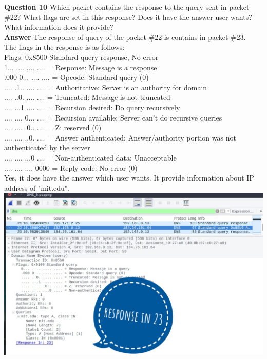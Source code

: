 \documentclass[14pt]{extarticle}
\begin{document}
    \noindent
    \textbf{\large Question 10}
    Which packet contains the response to the query sent in packet \#22? What flags are set in this response?
Does it have the answer user wants? What information does it provide?\\[10pt]
    \textbf{\large Answer}
    The response of query of the packet \#22 is contains in packet \#23.\\
    The flags in the response is as follows:\\
    Flags: 0x8500 Standard query response, No error\\
    1... .... .... .... = Response: Message is a response\\
    .000 0... .... .... = Opcode: Standard query (0)\\
    .... .1.. .... .... = Authoritative: Server is an authority for domain\\
    .... ..0. .... .... = Truncated: Message is not truncated\\
    .... ...1 .... .... = Recursion desired: Do query recursively\\
    .... .... 0... .... = Recursion available: Server can't do recursive queries\\
    .... .... .0.. .... = Z: reserved (0)\\
    .... .... ..0. .... = Answer authenticated: Answer/authority portion was not authenticated by the server\\
    .... .... ...0 .... = Non-authenticated data: Unacceptable\\
    .... .... .... 0000 = Reply code: No error (0)\\
    Yes, it does have the answer which user wants. It provide information about IP address of "mit.edu".\\[10pt]
    \includegraphics[scale=0.45]{3_10_1}\\[10pt]
\end{document}
